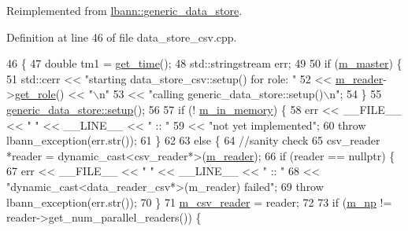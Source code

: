 Reimplemented from \hyperlink{classlbann_1_1generic__data__store_a1cff17def02ee21b6ca0befeb04bb582}{lbann\+::generic\+\_\+data\+\_\+store}.



Definition at line 46 of file data\+\_\+store\+\_\+csv.\+cpp.


\begin{DoxyCode}
46                            \{
47   \textcolor{keywordtype}{double} tm1 = \hyperlink{namespacelbann_a478d36031ff0659893c4322cd856157f}{get\_time}();
48   std::stringstream err;
49 
50   \textcolor{keywordflow}{if} (\hyperlink{classlbann_1_1generic__data__store_a143fd33ef3a53180bc62745e369c16f8}{m\_master}) \{
51     std::cerr << \textcolor{stringliteral}{"starting data\_store\_csv::setup() for role: "} 
52               << \hyperlink{classlbann_1_1generic__data__store_afa49ced0ab64c632371ea52532a91ec2}{m\_reader}->\hyperlink{classlbann_1_1generic__data__reader_a92982e1b399f37e2ead5aa440883cba5}{get\_role}() << \textcolor{stringliteral}{"\(\backslash\)n"}
53               << \textcolor{stringliteral}{"calling generic\_data\_store::setup()\(\backslash\)n"};
54   \}
55   \hyperlink{classlbann_1_1generic__data__store_a1cff17def02ee21b6ca0befeb04bb582}{generic\_data\_store::setup}();
56 
57   \textcolor{keywordflow}{if} (! \hyperlink{classlbann_1_1generic__data__store_a1a9cc7b097cd7dd6ae0d12d52bb43ea1}{m\_in\_memory}) \{
58     err << \_\_FILE\_\_ << \textcolor{stringliteral}{" "} << \_\_LINE\_\_ << \textcolor{stringliteral}{" :: "}
59         << \textcolor{stringliteral}{"not yet implemented"};
60     \textcolor{keywordflow}{throw} lbann\_exception(err.str());
61   \} 
62   
63   \textcolor{keywordflow}{else} \{
64     \textcolor{comment}{//sanity check}
65     csv\_reader *reader = \textcolor{keyword}{dynamic\_cast<}csv\_reader*\textcolor{keyword}{>}(\hyperlink{classlbann_1_1generic__data__store_afa49ced0ab64c632371ea52532a91ec2}{m\_reader});
66     \textcolor{keywordflow}{if} (reader == \textcolor{keyword}{nullptr}) \{
67       err << \_\_FILE\_\_ << \textcolor{stringliteral}{" "} << \_\_LINE\_\_ << \textcolor{stringliteral}{" :: "}
68           << \textcolor{stringliteral}{"dynamic\_cast<data\_reader\_csv*>(m\_reader) failed"};
69       \textcolor{keywordflow}{throw} lbann\_exception(err.str());
70     \}
71     \hyperlink{classlbann_1_1data__store__csv_a8920e09beb3e40e59e2858daf95a6cf9}{m\_csv\_reader} = reader;
72 
73     \textcolor{keywordflow}{if} (\hyperlink{classlbann_1_1generic__data__store_afcd4f99959c265c8c03dcf8ad3779d85}{m\_np} != reader->get\_num\_parallel\_readers()) \{

\end{DoxyCode}
